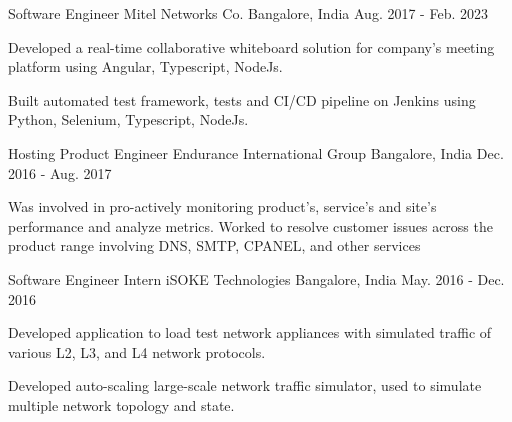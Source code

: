 

\begin{cventries}

  \cventry
    {Software Engineer} %
    {Mitel Networks Co.} %
    {Bangalore, India} %
    {Aug. 2017 - Feb. 2023} %
    {
      \begin{cvitems} %
        \item {Developed a real-time collaborative whiteboard solution for company's meeting platform using Angular, Typescript, NodeJs.}
        \item {Built automated test framework, tests and CI/CD pipeline on Jenkins using Python, Selenium, Typescript, NodeJs.}
      \end{cvitems}
    }

  \cventry
    {Hosting Product Engineer} %
    {Endurance International Group} %
    {Bangalore, India} %
    {Dec. 2016 - Aug. 2017} %
    {
      \begin{cvitems} %
        \item {Was involved in pro-actively monitoring product's, service's and site's performance and analyze metrics. Worked to resolve customer issues across the product range involving DNS, SMTP, CPANEL, and other services}
      \end{cvitems}
    }

  \cventry
    {Software Engineer Intern} %
    {iSOKE Technologies } %
    {Bangalore, India} %
    {May. 2016 - Dec. 2016} %
    {
      \begin{cvitems} %
        \item {Developed application to load test network appliances with simulated traffic of various L2, L3, and L4 network protocols.}
        \item {Developed auto-scaling large-scale network traffic simulator, used to simulate multiple network topology and state.}
      \end{cvitems}
    }
\end{cventries}
